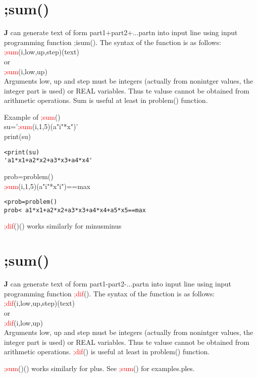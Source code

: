 \section{;sum()}
\label{inpusum}
\textbf{J} can generate text of form part1+part2+...partn into input line using
 input programming function ;isum(). The syntax of the function is as follows:\\
 \textcolor{Red}{;sum}(i,low,up,step)(text)\\
or \\
\textcolor{Red}{;sum}(i,low,up)\\
Arguments low, up and step must be integers (actually from nonintger values, the
 integer part is used) or REAL variables. Thus te valuse cannot be obtained
 from arithmetic operations. Sum is useful at least in \textcolor{VioletRed}{problem}() function.
\begin{example}[inpusumex]Example of \textcolor{Red}{;sum}()\\
\label{inpusumex}
su='\textcolor{Red}{;sum}(i,1,5)(a"i"*x")'\\
\textcolor{VioletRed}{print}(su)
\color{Green}
\begin{verbatim}
<print(su)
'a1*x1+a2*x2+a3*x3+a4*x4'
\end{verbatim}
\color{Black}
prob=\textcolor{VioletRed}{problem}()\\
\textcolor{Red}{;sum}(i,1,5)(a"i"*x"i")==max
\color{Green}
\begin{verbatim}
<prob=problem()
prob< a1*x1+a2*x2+a3*x3+a4*x4+a5*x5==max
\end{verbatim}
\color{Black}
\end{example}
\begin{note}
\textcolor{Red}{;dif}()() works similarly for minusminus
\end{note}
\section{;sum()}
\label{inpudif}
\textbf{J} can generate text of form part1-part2-...partn into input line using
 input programming function \textcolor{Red}{;dif}(). The syntax of the function is as follows:\\
 \textcolor{Red}{;dif}(i,low,up,step)(text)\\
or \\
\textcolor{Red}{;dif}(i,low,up)\\
Arguments low, up and step must be integers (actually from nonintger values, the
 integer part is used) or REAL variables. Thus te valuse cannot be obtained
 from arithmetic operations. \textcolor{Red}{;dif}() is useful at least in \textcolor{VioletRed}{problem}() function.
\begin{note}
\textcolor{Red}{;sum}()() works similarly for plus. See \textcolor{Red}{;sum}() for examples.ples.
\end{note}
